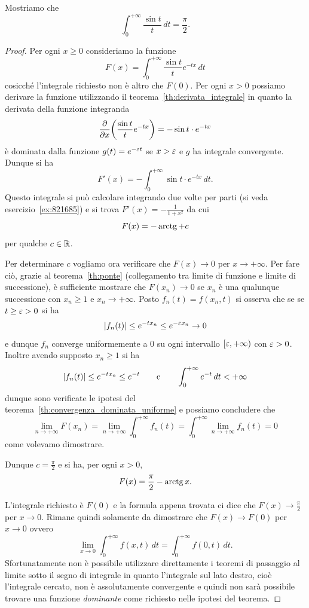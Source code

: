 \begin{exercise}
  \label{ex:integrale_sin_integrale}%
Mostriamo che 
  \[
    \int_0^{+\infty} \frac{\sin t}{t}\, dt = \frac \pi 2.
  \] 
\end{exercise}
\begin{proof}
Per ogni $x \ge 0$ consideriamo la funzione 
\[
  F(x) = \int_0^{+\infty} \frac{\sin t}{t}e^{-tx}\, dt
\]
cosicché l'integrale richiesto non è altro che $F(0)$.
Per ogni $x>0$
possiamo derivare la funzione utilizzando il teorema~\ref{th:derivata_integrale}
in quanto la derivata della funzione integranda 
\[
  \frac{\partial}{\partial x}{\left( \frac{\sin t}{t}e^{-tx} \right)} 
  = -\sin t \cdot e^{-tx}
\]
è dominata dalla funzione $g(t) = e^{- \varepsilon t}$ se $x>\varepsilon$ e 
$g$ ha integrale convergente.
Dunque si ha 
\[
  F'(x) = - \int_0^{+\infty} \sin t \cdot e^{-tx}\, dt. 
\]
Questo integrale si può calcolare integrando due volte per parti 
(si veda esercizio~\ref{ex:821685}) e si trova 
$F'(x) = -\frac{1}{1+x^2}$ da cui
\[
  F(x) = -\operatorname{arctg} + c
\]
per qualche $c \in {\mathbb R}$.

Per determinare $c$ 
vogliamo ora verificare che $F(x) \to 0$ per $x\to +\infty$.
Per fare ciò, grazie al teorema~\ref{th:ponte} (collegamento tra limite 
di funzione e limite di successione), è sufficiente 
mostrare che $F(x_n) \to 0$ se $x_n$ è una qualunque successione 
con $x_n\ge 1$ e $x_n \to +\infty$.
Posto $f_n(t) = f(x_n,t)$ si osserva che se se $t\ge \varepsilon>0$ si ha 
\[
  {\left|f_n(t)\right|} \le e^{-tx_n} \le e^{-\varepsilon x_n} \to 0  
\]
e dunque $f_n$ converge uniformemente a $0$ su ogni intervallo 
$[\varepsilon,+\infty)$ con $\varepsilon>0$. Inoltre avendo supposto $x_n\ge 1$ si ha  
\[
 {\left|f_n(t)\right|} \le e^{-tx_n} \le e^{-t}
 \qquad \text{e} \qquad 
 \int_0^{+\infty} e^{-t}\, dt < +\infty
\]
dunque sono verificate le ipotesi del teorema~\ref{th:convergenza_dominata_uniforme}
e possiamo concludere che 
\[
  \lim_{n\to+\infty} F(x_n) = \lim_{n\to+\infty} \int_0^{+\infty} f_n(t) 
  = \int_0^{+\infty} \lim_{n\to+\infty} f_n(t) = 0
\]
come volevamo dimostrare.

Dunque $c=\frac{\pi} 2$ e si ha, per ogni $x>0$,
\[
  F(x) = \frac{\pi} 2 - \operatorname{arctg} x.
\]

L'integrale richiesto è $F(0)$ e la formula appena trovata ci 
dice che $F(x)\to \frac \pi 2$ per $x\to 0$. 
Rimane quindi solamente da dimostrare che $F(x)\to F(0)$ per 
$x\to 0$ ovvero 
\[
  \lim_{x\to 0} \int_0^{+\infty} f(x,t) \, dt
  = \int_0^{+\infty} f(0,t) \, dt.
\]
Sfortunatamente non è possibile utilizzare direttamente i teoremi 
di passaggio al limite sotto il segno di integrale in quanto 
l'integrale sul lato destro, cioè l'integrale cercato, non 
è assolutamente convergente e quindi non sarà possibile trovare 
una funzione \emph{dominante} come richiesto nelle ipotesi del teorema.


\end{proof}
